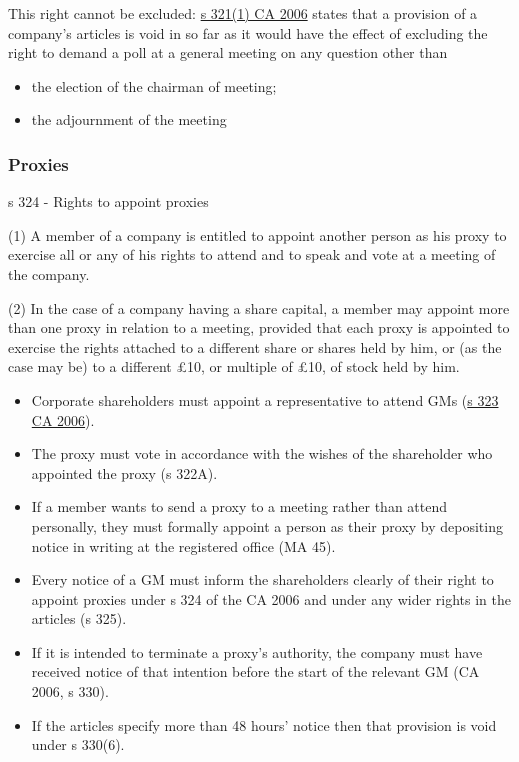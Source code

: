 \documentclass[
]{article}
\providecommand{\tightlist}{%
  \setlength{\itemsep}{0pt}\setlength{\parskip}{0pt}}
\newenvironment{env-12fb5320-b8eb-47b6-8035-097e16242c42}
{
    \savenotes\tcolorbox[blanker,breakable,left=5pt,borderline west={2pt}{-4pt}{green}]
}
{
    \endtcolorbox\spewnotes
}
\begin{document}
This right cannot be excluded:
\href{https://www.legislation.gov.uk/ukpga/2006/46/section/321}{s 321(1)
CA 2006} states that a provision of a company's articles is void in so
far as it would have the effect of excluding the right to demand a poll
at a general meeting on any question other than

\begin{itemize}
\tightlist
\item
  the election of the chairman of meeting;
\item
  the adjournment of the meeting
\end{itemize}

\hypertarget{proxies-1}{%
\subsubsection{Proxies}\label{proxies-1}}

\begin{env-12fb5320-b8eb-47b6-8035-097e16242c42}

s 324 - Rights to appoint proxies

(1) A member of a company is entitled to appoint another person as his
proxy to exercise all or any of his rights to attend and to speak and
vote at a meeting of the company.

(2) In the case of a company having a share capital, a member may
appoint more than one proxy in relation to a meeting, provided that each
proxy is appointed to exercise the rights attached to a different share
or shares held by him, or (as the case may be) to a different £10, or
multiple of £10, of stock held by him.

\end{env-12fb5320-b8eb-47b6-8035-097e16242c42}

\begin{itemize}
\tightlist
\item
  Corporate shareholders must appoint a representative to attend GMs
  (\href{https://www.legislation.gov.uk/ukpga/2006/46/section/323}{s 323
  CA 2006}).
\item
  The proxy must vote in accordance with the wishes of the shareholder
  who appointed the proxy (s 322A).
\item
  If a member wants to send a proxy to a meeting rather than attend
  personally, they must formally appoint a person as their proxy by
  depositing notice in writing at the registered office (MA 45).
\item
  Every notice of a GM must inform the shareholders clearly of their
  right to appoint proxies under s 324 of the CA 2006 and under any
  wider rights in the articles (s 325).
\item
  If it is intended to terminate a proxy's authority, the company must
  have received notice of that intention before the start of the
  relevant GM (CA 2006, s 330).
\item
  If the articles specify more than 48 hours' notice then that provision
  is void under s 330(6).
\end{itemize}
\end{document}
